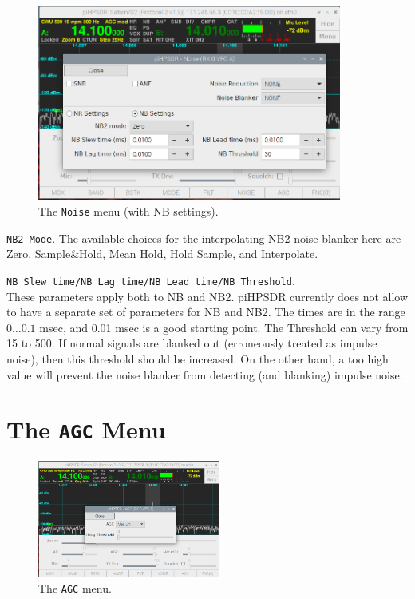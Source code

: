 \documentclass[12pt]{book}
\def\rett#1{\texttt{\color{red}#1}}
\def\bltt#1{\texttt{\color{blue}#1}}
\def\pH{pi\-HPSDR\xspace}
\begin{document}
\begin{figure}[ht]
\center
\includegraphics[width=10cm]{NoiseMenu2.png}
\caption{The \bltt{Noise} menu (with NB settings).}
\label{fig:NoiseMenu2}
\end{figure}
\rett{NB2 Mode}. The available choices for the interpolating NB2 noise blanker here are Zero,
Sample\&Hold, Mean Hold, Hold Sample, and Interpolate.

\rett{NB Slew time/NB Lag time/NB Lead time/NB Threshold}.\\
 These parameters apply both to NB and NB2.
\pH currently does not allow to have a separate set of parameters for NB and NB2.
The times are in the range $0\ldots0.1$ msec, and 0.01 msec is a good starting point. The Threshold
can vary from 15 to 500. If normal signals are blanked out (erroneously treated as impulse noise),
then this threshold should be increased. On the other hand, a too high value will prevent the
noise blanker from detecting (and blanking) impulse noise.


\section{The \texttt{AGC} Menu}

\begin{figure}[ht]
\center
\includegraphics[width=6cm]{AGCMenu.png}
\caption{The \bltt{AGC} menu.}
\label{fig:AGCMenu}
\end{figure}
\end{document}
